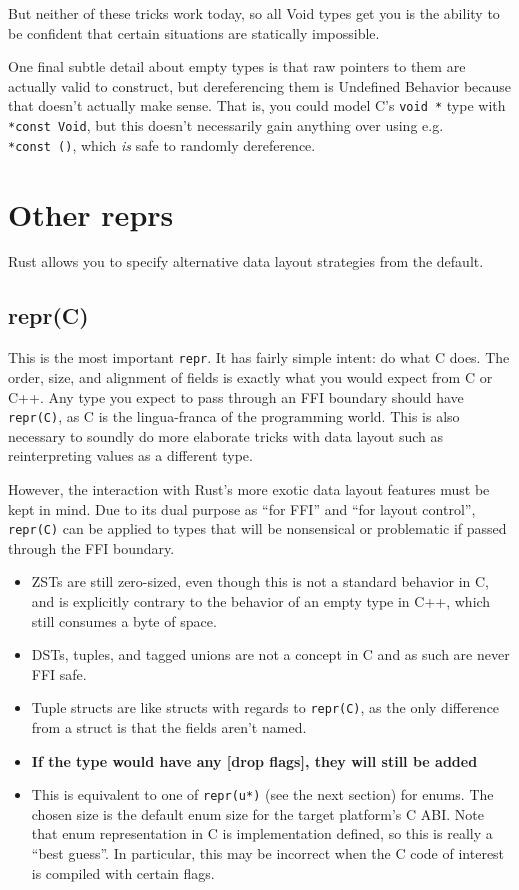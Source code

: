 \documentclass[a4paper,]{book}
\begin{document}
But neither of these tricks work today, so all Void types get you is the
ability to be confident that certain situations are statically
impossible.

One final subtle detail about empty types is that raw pointers to them
are actually valid to construct, but dereferencing them is Undefined
Behavior because that doesn't actually make sense. That is, you could
model C's \texttt{void\ *} type with \texttt{*const\ Void}, but this
doesn't necessarily gain anything over using e.g. \texttt{*const\ ()},
which \emph{is} safe to randomly dereference.

\section{Other reprs}\label{sec--other-reprs}

Rust allows you to specify alternative data layout strategies from the
default.

\subsection{repr(C)}\label{reprc}

This is the most important \texttt{repr}. It has fairly simple intent:
do what C does. The order, size, and alignment of fields is exactly what
you would expect from C or C++. Any type you expect to pass through an
FFI boundary should have \texttt{repr(C)}, as C is the lingua-franca of
the programming world. This is also necessary to soundly do more
elaborate tricks with data layout such as reinterpreting values as a
different type.

However, the interaction with Rust's more exotic data layout features
must be kept in mind. Due to its dual purpose as ``for FFI'' and ``for
layout control'', \texttt{repr(C)} can be applied to types that will be
nonsensical or problematic if passed through the FFI boundary.

\begin{itemize}
\item
  ZSTs are still zero-sized, even though this is not a standard behavior
  in C, and is explicitly contrary to the behavior of an empty type in
  C++, which still consumes a byte of space.
\item
  DSTs, tuples, and tagged unions are not a concept in C and as such are
  never FFI safe.
\item
  Tuple structs are like structs with regards to \texttt{repr(C)}, as
  the only difference from a struct is that the fields aren't named.
\item
  \textbf{If the type would have any {[}drop flags{]}, they will still
  be added}
\item
  This is equivalent to one of \texttt{repr(u*)} (see the next section)
  for enums. The chosen size is the default enum size for the target
  platform's C ABI. Note that enum representation in C is implementation
  defined, so this is really a ``best guess''. In particular, this may
  be incorrect when the C code of interest is compiled with certain
  flags.
\end{itemize}
\end{document}
